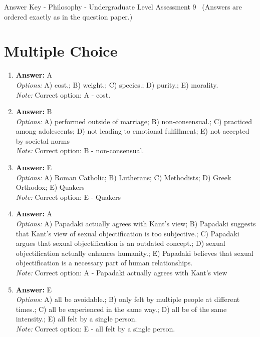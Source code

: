 \documentclass[12pt]{article}
\begin{document}
\begin{center}
Answer Key - Philosophy - Undergraduate Level Assessment 9 \
\small (Answers are ordered exactly as in the question paper.)
\end{center}

\section*{Multiple Choice}
\begin{enumerate}[label=\arabic*.]
\item \textbf{Answer:} A
\\ \textit{Options:} A) cost.; B) weight.; C) species.; D) purity.; E) morality.
\\ \textit{Note:} Correct option: A - cost.
\item \textbf{Answer:} B
\\ \textit{Options:} A) performed outside of marriage; B) non-consensual.; C) practiced among adolescents; D) not leading to emotional fulfillment; E) not accepted by societal norms
\\ \textit{Note:} Correct option: B - non-consensual.
\item \textbf{Answer:} E
\\ \textit{Options:} A) Roman Catholic; B) Lutherans; C) Methodists; D) Greek Orthodox; E) Quakers
\\ \textit{Note:} Correct option: E - Quakers
\item \textbf{Answer:} A
\\ \textit{Options:} A) Papadaki actually agrees with Kant's view; B) Papadaki suggests that Kant's view of sexual objectification is too subjective.; C) Papadaki argues that sexual objectification is an outdated concept.; D) sexual objectification actually enhances humanity.; E) Papadaki believes that sexual objectification is a necessary part of human relationships.
\\ \textit{Note:} Correct option: A - Papadaki actually agrees with Kant's view
\item \textbf{Answer:} E
\\ \textit{Options:} A) all be avoidable.; B) only felt by multiple people at different times.; C) all be experienced in the same way.; D) all be of the same intensity.; E) all felt by a single person.
\\ \textit{Note:} Correct option: E - all felt by a single person.
\end{enumerate}
\end{document}
